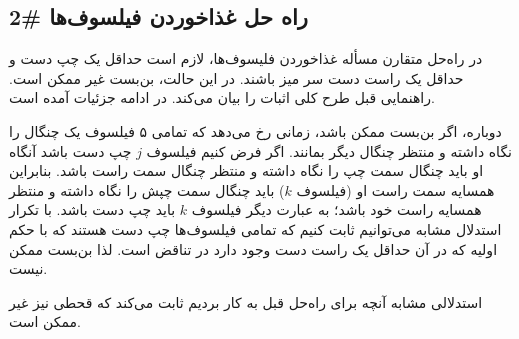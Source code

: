 \documentclass{book}
\newcommand{\clearemptydoublepage}{\newpage\cleardoublepage}
\begin{document}

\clearemptydoublepage
\subsection{راه حل غذاخوردن فیلسوف‌ها \#2}

    در راه‌حل متقارن مسأله غذاخوردن فلیسوف‌ها، لازم است حداقل یک چپ دست و  حداقل یک راست دست سر میز باشند. 
    در این حالت، بن‌بست غیر ممکن است. راهنمایی قبل طرح کلی اثبات را بیان می‌کند.
    در ادامه جزئیات آمده است. 

    دوباره، اگر بن‌بست ممکن باشد، زمانی رخ می‌دهد که تمامی ۵ فیلسوف یک چنگال را نگاه داشته و منتظر چنگال دیگر بمانند. 
    اگر فرض کنیم فیلسوف $j$ چپ دست باشد آنگاه او باید چنگال سمت چپ را نگاه داشته و منتظر چنگال سمت راست باشد. 
    بنابراین همسایه سمت راست او (فیلسوف $k$) باید چنگال سمت چپش را نگاه داشته و منتظر همسایه راست خود باشد؛ به عبارت دیگر 
    فیلسوف $k$ باید چپ دست باشد. با تکرار استدلال مشابه می‌توانیم ثابت کنیم که تمامی فیلسوف‌ها چپ دست هستند که با حکم اولیه که در آن 
    حداقل یک راست دست وجود دارد در تناقض است. لذا بن‌بست ممکن نیست. 

    استدلالی مشابه آنچه برای راه‌حل قبل به کار بردیم ثابت می‌کند که قحطی نیز غیر ممکن است. 


\clearemptydoublepage
\end{document}
